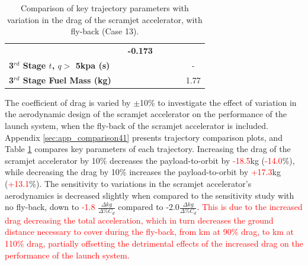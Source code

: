 \begin{table}[ht]
\begin{tabular}{l c c c c c c}
		& \textbf{\thirddExergyEffCdOneHundredTen}
		& \textbf{-0.173}
		\\
		\textbf{3$^{rd}$ Stage $t$, $q >$ 5kpa (s)}
		& \thirdqOverFiveCdNinety
		& \thirdqOverFiveCdNinetyFive
		& \thirdqOverFiveCdStandard
		& \thirdqOverFiveCdOneHundredFive
		& \thirdqOverFiveCdOneHundredTen
		& -
		\\
		\textbf{3$^{rd}$ Stage Fuel Mass (kg)}
		& \thirdmFuelCdNinety
		& \thirdmFuelCdNinetyFive
		& \thirdmFuelCdStandard
		& \thirdmFuelCdOneHundredFive
		& \thirdmFuelCdOneHundredTen
		& 1.77
		\\
		\hline 
	\end{tabular} 
	\caption{Comparison of key trajectory parameters with variation in the drag of the scramjet accelerator, with fly-back (Case 13).}
	\label{tab:comparison41}
\end{table}


The coefficient of drag is varied by $\pm$10\% to investigate the effect of variation in the aerodynamic design of the scramjet accelerator on the performance of the launch system, when the fly-back of the scramjet accelerator is included. Appendix \ref{sec:app_comparison41} presents trajectory comparison plots, and Table \ref{tab:comparison41} compares key parameters of each trajectory. 
Increasing the drag of the scramjet accelerator by 10\% decreases the payload-to-orbit by \textcolor{red}{-18.5}kg (\textcolor{red}{-14.0}\%), while decreasing the drag by 10\% increases the payload-to-orbit by \textcolor{red}{+17.3}kg (\textcolor{red}{+13.1}\%). 
The sensitivity to variations in the scramjet accelerator's aerodynamics is decreased slightly when compared to the sensitivity study with no fly-back, down to \textcolor{red}{-1.8} $\frac{\Delta kg}{\Delta\% C_{d}}$ compared to -2.0$\frac{\Delta kg}{\Delta\% C_{d}}$.
\textcolor{red}{This is due to the increased drag decreasing the total acceleration, which in turn decreases the ground distance necessary to cover during the fly-back, from \returnDistCdNinety km at 90\% drag, to \returnDistCdOneHundredTen km at 110\% drag, partially offsetting the detrimental effects of the increased drag on the performance of the launch system. }

